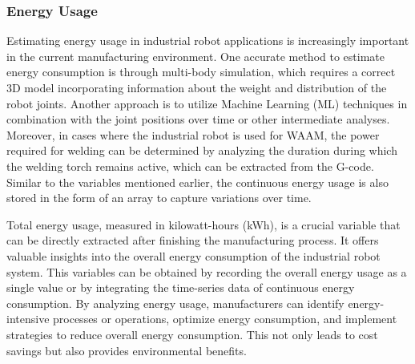 \subsubsection*{Energy Usage}
Estimating energy usage in industrial robot applications is increasingly important in the current manufacturing environment. One accurate method to estimate energy consumption is through multi-body simulation, which requires a correct 3D model incorporating information about the weight and distribution of the robot joints. Another approach is to utilize Machine Learning (\acrshort{ML}) techniques in combination with the joint positions over time or other intermediate analyses. Moreover, in cases where the industrial robot is used for \acrshort{WAAM}, the power required for welding can be determined by analyzing the duration during which the welding torch remains active, which can be extracted from the G-code. Similar to the variables mentioned earlier, the continuous energy usage is also stored in the form of an array to capture variations over time.

Total energy usage, measured in kilowatt-hours (kWh), is a crucial variable that can be directly extracted after finishing the manufacturing process. It offers valuable insights into the overall energy consumption of the industrial robot system. This variables can be obtained by recording the overall energy usage as a single value or by integrating the time-series data of continuous energy consumption. By analyzing energy usage, manufacturers can identify energy-intensive processes or operations, optimize energy consumption, and implement strategies to reduce overall energy consumption. This not only leads to cost savings but also provides environmental benefits.




